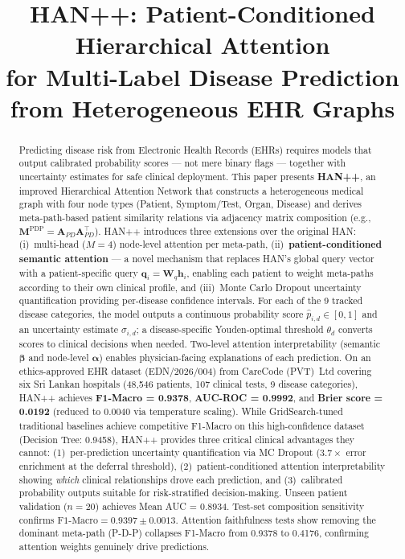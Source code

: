 \documentclass[conference]{IEEEtran}
\title{HAN++: Patient-Conditioned Hierarchical Attention\\for Multi-Label Disease Prediction from Heterogeneous EHR Graphs}
\author{
  \IEEEauthorblockN{Anushka Samaranayake,\quad
                    JohnPeter Charles,\quad
                    Tashin Kavishan,\quad
                    Mailki Meghana Wickramasinghe}
  \IEEEauthorblockA{Department of Electronic and Telecommunication Engineering /
                    Biomedical Engineering,\\
                    University of Moratuwa, Sri Lanka\\
                    \{anushkasandeepa522, jpcharlie02,
                      tashinkavishan123, malkimeghana1\}@gmail.com}
}
\begin{document}
\maketitle

\begin{abstract}
Predicting disease risk from Electronic Health Records (EHRs) requires
models that output calibrated probability scores --- not mere binary
flags --- together with uncertainty estimates for safe clinical deployment.
This paper presents \textbf{HAN++}, an improved Hierarchical Attention
Network that constructs a heterogeneous medical graph with four node
types (Patient, Symptom/Test, Organ, Disease) and derives meta-path-based
patient similarity relations via adjacency matrix composition
(e.g., $\mathbf{M}^{\text{PDP}} = \mathbf{A}_{PD}\mathbf{A}_{PD}^{\top}$).
HAN++ introduces three extensions over the original HAN:
(i)~multi-head ($M{=}4$) node-level attention per meta-path,
(ii)~\textbf{patient-conditioned semantic attention} --- a novel mechanism
that replaces HAN's global query vector with a patient-specific query
$\mathbf{q}_i = \mathbf{W}_q \mathbf{h}_i$, enabling each patient to
weight meta-paths according to their own clinical profile, and
(iii)~Monte Carlo Dropout uncertainty quantification providing
per-disease confidence intervals.
For each of the 9 tracked disease categories, the model outputs a
continuous probability score $\hat{p}_{i,d} \in [0,1]$ and an
uncertainty estimate $\sigma_{i,d}$; a disease-specific Youden-optimal
threshold $\theta_d$ converts scores to clinical decisions when needed.
Two-level attention interpretability (semantic $\boldsymbol{\beta}$
and node-level $\boldsymbol{\alpha}$) enables physician-facing
explanations of each prediction.
On an ethics-approved EHR dataset (EDN/2026/004) from CareCode (PVT)~Ltd
covering six Sri Lankan hospitals (48,546 patients, 107 clinical tests,
9 disease categories), HAN++ achieves
\textbf{F1-Macro = 0.9378}, \textbf{AUC-ROC = 0.9992}, and
\textbf{Brier score = 0.0192} (reduced to 0.0040 via temperature scaling).
While GridSearch-tuned traditional baselines achieve competitive F1-Macro
on this high-confidence dataset (Decision Tree: 0.9458), HAN++ provides
three critical clinical advantages they cannot: (1)~per-prediction
uncertainty quantification via MC Dropout ($3.7\times$ error enrichment
at the deferral threshold), (2)~patient-conditioned attention
interpretability showing \emph{which} clinical relationships drove each
prediction, and (3)~calibrated probability outputs suitable for
risk-stratified decision-making.
Unseen patient validation ($n{=}20$) achieves Mean AUC = 0.8934.
Test-set composition sensitivity confirms $\text{F1-Macro} = 0.9397 \pm 0.0013$.
Attention faithfulness tests show removing the dominant meta-path
(P-D-P) collapses F1-Macro from 0.9378 to 0.4176, confirming
attention weights genuinely drive predictions.
\end{abstract}
\end{document}
